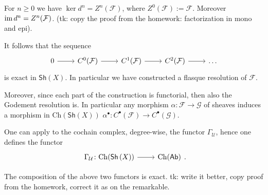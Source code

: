 \documentclass[../Main]{subfiles}
\begin{document}
\begin{rem}[]
	For $n \geq 0$ we have $\ker d^n = Z^n(\mathcal{F})$,
	where $Z^0(\mathcal{F}) := \mathcal{F}$.
	Moreover $\operatorname{im} d^n = Z^n(\mathcal{F})$.
	(tk: copy the proof from the homework: factorization in mono and epi).

	It follows that the sequence
	\begin{equation}
	\begin{tikzcd}
		0 \arrow[r, "", rightarrow] &
		C^0(\mathcal{F}) \arrow[r, "", rightarrow] &
		C^1(\mathcal{F}) \arrow[r, "", rightarrow] &
		C^2(\mathcal{F}) \arrow[r, "", rightarrow] &
		\ldots
	\end{tikzcd}
	\end{equation} 
	is exact in $\mathsf{Sh}\left(X\right)$.
	In particular we have constructed a flasque resolution of $\mathcal{F}$.

	Moreover, since each part of the construction is
	functorial, then also the Godement resolution is.
	In particular any morphism $\alpha\colon \mathcal{F} \to \mathcal{G}$ of sheaves
	induces a morphism in $\mathrm{Ch}(\mathsf{Sh}\left(X\right))$
	$\alpha^\bullet\colon C^\bullet(\mathcal{F}) \to C^\bullet(\mathcal{G})$.
\end{rem}
One can apply to the cochain complex, degree-wise, the functor $\Gamma_{\mathcal{U}}$,
hence one defines the functor
\begin{equation}
\begin{tikzcd}
	\Gamma_{\mathcal{U}}\colon \mathrm{Ch}(\mathsf{Sh}\left(X\right)) \arrow[r, "", rightarrow] &
	\mathrm{Ch}(\mathsf{Ab})
\end{tikzcd}
.\end{equation} 
\begin{prop}[]
	The composition of the above two functors is exact.
	tk: write it better, copy proof from the homework, correct it as on the remarkable.
\end{prop}
\end{document}
